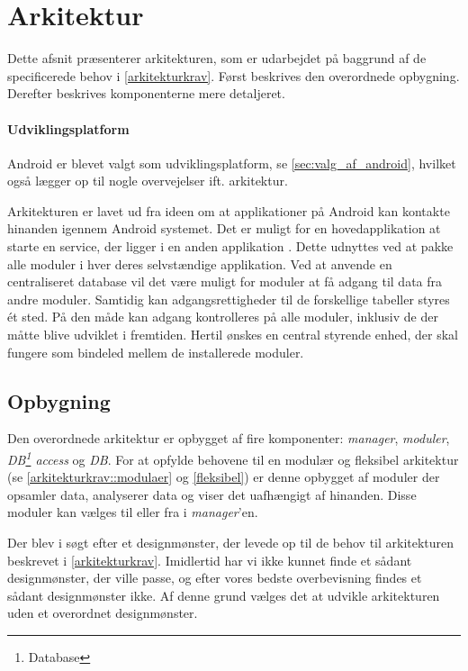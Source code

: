 \section{Arkitektur}\label{sec:arkitektur}
Dette afsnit præsenterer arkitekturen, som er udarbejdet på baggrund af de specificerede behov i \cref{arkitekturkrav}.
Først beskrives den overordnede opbygning.
Derefter beskrives komponenterne mere detaljeret.

\paragraph{Udviklingsplatform}
Android er blevet valgt som udviklingsplatform, se \cref{sec:valg_af_android}, hvilket også lægger op til nogle overvejelser ift. arkitektur.

Arkitekturen er lavet ud fra ideen om at applikationer på Android kan kontakte hinanden igennem Android systemet.
Det er muligt for en hovedapplikation at starte en service, der ligger i en anden applikation \citep{android_service}.
Dette udnyttes ved at pakke alle moduler i hver deres selvstændige applikation.
Ved at anvende en centraliseret database vil det være muligt for moduler at få adgang til data fra andre moduler.
Samtidig kan adgangsrettigheder til de forskellige tabeller styres ét sted.
På den måde kan adgang kontrolleres på alle moduler, inklusiv de der måtte blive udviklet i fremtiden.
Hertil ønskes en central styrende enhed, der skal fungere som bindeled mellem de installerede moduler.

\subsection{Opbygning}\label{arkitektur:opbygning}
Den overordnede arkitektur er opbygget af fire komponenter: \textit{manager}, \textit{moduler}, \textit{DB\footnote{Database} access} og \textit{DB}.
For at opfylde behovene til en modulær og fleksibel arkitektur (se \cref{arkitekturkrav::modulaer} og \cref{fleksibel}) er denne opbygget af moduler der opsamler data, analyserer data og viser det uafhængigt af hinanden.
Disse moduler kan vælges til eller fra i \textit{manager}'en.

Der blev i \citet{gamma1994design} søgt efter et designmønster, der levede op til de behov til arkitekturen beskrevet i \cref{arkitekturkrav}.
Imidlertid har vi ikke kunnet finde et sådant designmønster, der ville passe, og efter vores bedste overbevisning findes et sådant designmønster ikke.
Af denne grund vælges det at udvikle arkitekturen uden et overordnet designmønster.

